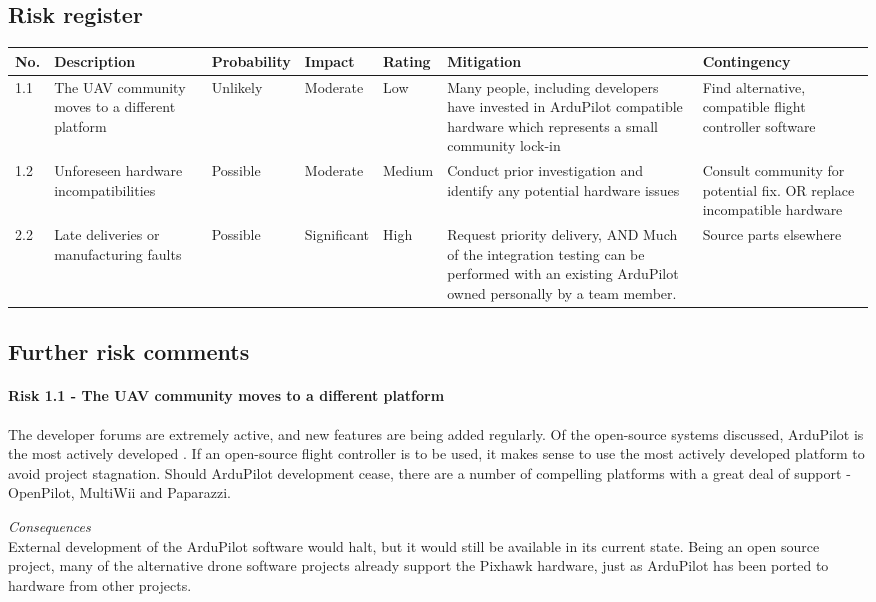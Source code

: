 \documentclass[a4paper, 11pt, titlepage]{article}
\begin{document}
\subsection{Risk register}
\begin{tabularx}{\textwidth}{lXlllXX}
\hline
    No.   & Description & Probability & Impact & Rating & Mitigation & Contingency \\
    \hline
    1.1   & The UAV community moves to a different platform & Unlikely & Moderate & Low   & Many people, including developers have invested in ArduPilot compatible hardware which represents a small community lock-in & Find alternative, compatible flight controller software \\ \hline
    1.2   & Unforeseen hardware incompatibilities & Possible & Moderate & Medium & Conduct prior investigation and identify any potential hardware issues & Consult community for potential fix. OR replace incompatible hardware \\ \hline
    2.2   & Late deliveries or manufacturing faults & Possible & Significant & High  & Request priority delivery, AND Much of the integration testing can be performed with an existing ArduPilot owned personally by a team member. & Source parts elsewhere \\
    \hline
\end{tabularx}

\subsection{Further risk comments}
\paragraph{Risk 1.1 - The UAV community moves to a different platform}

The developer forums are extremely active, and new features are being added regularly.  Of the open-source systems discussed, ArduPilot is the most actively developed \cite{ardupilot-gh-source,openpilot-gh-source,paparazzi-gh-source,multiwii-gh-source}. If an open-source flight controller is to be used, it makes sense to use the most actively developed platform to avoid project stagnation. Should ArduPilot development cease, there are a number of compelling platforms with a great deal of support - OpenPilot, MultiWii and Paparazzi. 

\textit{Consequences} \\
External development of the ArduPilot software would halt, but it would still be available in its current state.  Being an open source project, many of the alternative drone software projects already support the Pixhawk hardware, just as ArduPilot has been ported to hardware from other projects.
\end{document}
